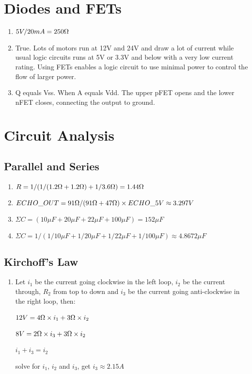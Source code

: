 \documentclass{article}
\begin{document}
\section{Diodes and FETs}
\begin{enumerate}
	\item $5V/20mA=250\ohm$
	\item True. Lots of motors run at 12V and 24V and draw a lot of current while usual logic circuits runs at 5V or 3.3V and below with a very low current rating. Using FETs enables a logic circuit to use minimal power to control the flow of larger power.
	\item Q equals Vss. When A equals Vdd. The upper pFET opens and the lower nFET closes, connecting the output to ground.
\end{enumerate}

\section{Circuit Analysis}
\subsection{Parallel and Series}
	\begin{enumerate}
		\item $R=1/(1/(1.2\ohm+1.2\ohm)+1/3.6\ohm)=1.44\ohm$
		\item $ECHO\_OUT=91\ohm/(91\ohm+47\ohm)\times ECHO\_5V\approx 3.297V$
		\item $\Sigma C=(10\mu F+20\mu F+22\mu F+100\mu F)=152\mu F$
		\item $\Sigma C=1/(1/10\mu F+1/20\mu F+1/22\mu F+1/100\mu F)\approx 4.8672\mu F$
	\end{enumerate}
\subsection{Kirchoff's Law}
	\begin{enumerate}
		\item Let $i_1$ be the current going clockwise in the left loop, $i_2$ be the current through, $R_2$ from top to down and $i_3$ be the current going anti-clockwise in the right loop, then: \par
		$12V = 4\ohm \times i_1 + 3\ohm \times i_2$\par
		$8V = 2\ohm \times i_3 + 3\ohm \times i_2 $\par
		$i_1+i_3=i_2$\par
		solve for $i_1$, $i_2$ and $i_3$, get $i_3 \approx 2.15A$
	\end{enumerate}
	
\end{document}
